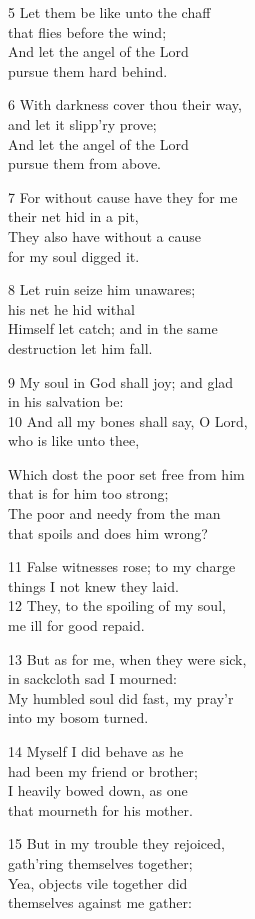 \begin{multicols}{3}
5 Let them be like unto the chaff\\
that flies before the wind;\\
And let the angel of the Lord\\
pursue them hard behind.

6 With darkness cover thou their way,\\
and let it slipp’ry prove;\\
And let the angel of the Lord\\
pursue them from above.

7 For without cause have they for me\\
their net hid in a pit,\\
They also have without a cause\\
for my soul digged it.

8 Let ruin seize him unawares;\\
his net he hid withal\\
Himself let catch; and in the same\\
destruction let him fall.

9 My soul in God shall joy; and glad\\
in his salvation be:\\
10 And all my bones shall say, O Lord,\\
who is like unto thee,

Which dost the poor set free from him\\
that is for him too strong;\\
The poor and needy from the man\\
that spoils and does him wrong?

11 False witnesses rose; to my charge\\
things I not knew they laid.\\
12 They, to the spoiling of my soul,\\
me ill for good repaid.

13 But as for me, when they were sick,\\
in sackcloth sad I mourned:\\
My humbled soul did fast, my pray’r\\
into my bosom turned.

14 Myself I did behave as he\\
had been my friend or brother;\\
I heavily bowed down, as one\\
that mourneth for his mother.

15 But in my trouble they rejoiced,\\
gath’ring themselves together;\\
Yea, objects vile together did\\
themselves against me gather:


\end{multicols}

